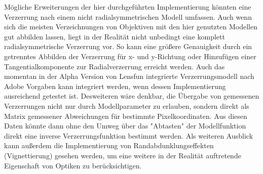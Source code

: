 Mögliche Erweiterungen der hier durchgeführten Implementierung könnten eine Verzerrung nach einem nicht radialsymmetrischen Modell umfassen. Auch wenn sich die meisten Verzeichnungen von Objektiven mit den hier genutzten Modellen gut abbilden lassen, liegt in der Realität nicht unbedingt eine komplett radialsymmetrische Verzerrung vor. So kann eine größere Genauigkeit durch ein getrenntes Abbilden der Verzerrung für x- und y-Richtung oder Hinzufügen einer Tangentialkomponente zur Radialverzerrung erreicht werden. Auch das momentan in der Alpha Version von Lensfun integrierte Verzerrungsmodell nach Adobe Vorgaben kann integriert werden, wenn dessen Implementierung ausreichend getestet ist. Desweiteren wäre denkbar, die Übergabe von gemessenen Verzerrungen nicht nur durch Modellparameter zu erlauben, sondern direkt als Matrix gemessener Abweichungen für bestimmte Pixelkoordinaten. Aus diesen Daten könnte dann ohne den Umweg über das "Abtasten" der Modellfunktion direkt eine inverse Verzerrungsfunktion bestimmt werden.
Als weiteren Ausblick kann außerdem die Implementierung von Randabdunklungseffekten (Vignettierung) gesehen werden, um eine weitere in der Realität auftretende Eigenschaft von Optiken zu berücksichtigen. 
